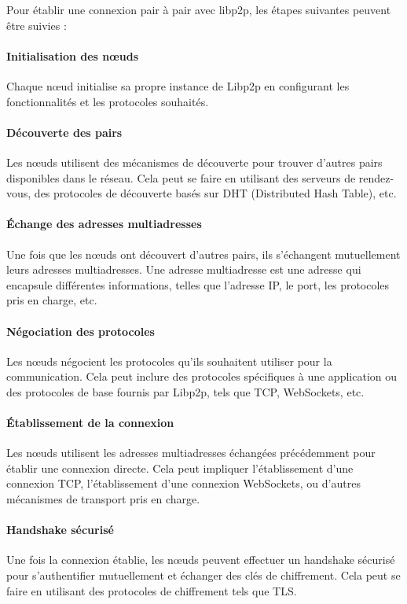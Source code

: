 Pour établir une connexion pair à pair avec libp2p, les étapes suivantes peuvent être suivies :
\paragraph{Initialisation des nœuds}
Chaque nœud initialise sa propre instance de Libp2p en configurant les fonctionnalités et les protocoles souhaités.

\paragraph{Découverte des pairs}
Les nœuds utilisent des mécanismes de découverte pour trouver d'autres pairs disponibles dans le réseau. Cela peut se faire en utilisant des serveurs de rendez-vous, des protocoles de découverte basés sur DHT (Distributed Hash Table), etc.

\paragraph{Échange des adresses multiadresses}
Une fois que les nœuds ont découvert d'autres pairs, ils s'échangent mutuellement leurs adresses multiadresses. Une adresse multiadresse est une adresse qui encapsule différentes informations, telles que l'adresse IP, le port, les protocoles pris en charge, etc.

\paragraph{Négociation des protocoles}
Les nœuds négocient les protocoles qu'ils souhaitent utiliser pour la communication. Cela peut inclure des protocoles spécifiques à une application ou des protocoles de base fournis par Libp2p, tels que TCP, WebSockets, etc.

\paragraph{Établissement de la connexion}
Les nœuds utilisent les adresses multiadresses échangées précédemment pour établir une connexion directe. Cela peut impliquer l'établissement d'une connexion TCP, l'établissement d'une connexion WebSockets, ou d'autres mécanismes de transport pris en charge.

\paragraph{Handshake sécurisé}  
Une fois la connexion établie, les nœuds peuvent effectuer un handshake sécurisé pour s'authentifier mutuellement et échanger des clés de chiffrement. Cela peut se faire en utilisant des protocoles de chiffrement tels que TLS.

